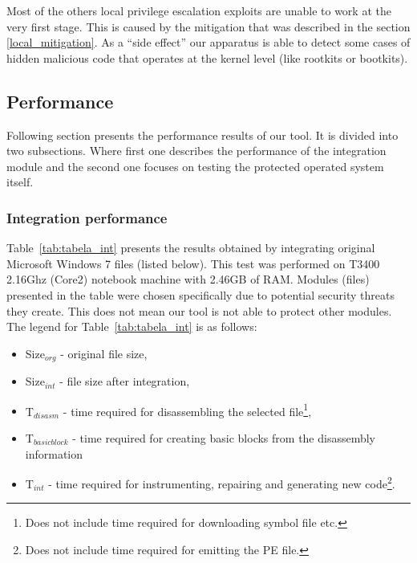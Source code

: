 \documentclass[10pt,twocolumn,a4paper]{article}
\begin{document}
Most of the others local privilege escalation exploits are unable to work at the very first stage. This is caused by the mitigation that was described in the section \ref{local_mitigation}. \newline
{\newline\noindent}As a ``side effect'' our apparatus is able to detect some cases of hidden malicious code that operates at the kernel level (like rootkits or bootkits).

\subsection{Performance}

Following section presents the performance results of our tool. It is divided into two subsections. Where first one describes the performance of the integration module and the second one focuses on testing the protected operated system itself.

\subsubsection{Integration performance}\label{sec:int_performance}

Table~\ref{tab:tabela_int} presents the results obtained by integrating original Microsoft Windows 7 files (listed below). This test was performed on T3400 2.16Ghz (Core2) notebook machine with 2.46GB of RAM. Modules (files) presented in the table were chosen specifically due to potential security threats they create. This does not mean our tool is not able to protect other modules.\newline
{\newline}The legend for Table~\ref{tab:tabela_int} is as follows:
\begin{itemize}
    \item Size$_{org}$ - original file size,
    \item Size$_{int}$ - file size after integration,
    \item T$_{disasm}$ - time required for disassembling the selected file\footnote{Does not include time required for downloading symbol file etc.},
    \item T$_{basicblock}$ - time required for creating basic blocks from the disassembly information
    \item T$_{int}$ - time required for instrumenting, repairing and generating new code\footnote{Does not include time required for emitting the PE file.}.
\end{itemize}
\end{document}
